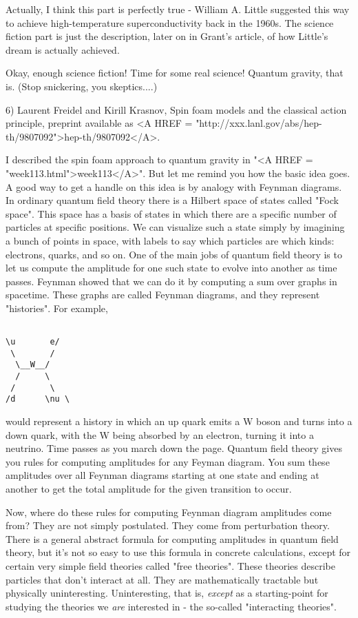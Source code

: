 Actually, I think this part is perfectly true - William A. Little
suggested this way to achieve high-temperature superconductivity back in
the 1960s.  The science fiction part is just the description, later on
in Grant's article, of how Little's dream is actually achieved.

Okay, enough science fiction!  Time for some real science!  Quantum
gravity, that is.  (Stop snickering, you skeptics....)

6) Laurent Freidel and Kirill Krasnov, Spin foam models and the 
classical action principle, preprint available as <A HREF = "http://xxx.lanl.gov/abs/hep-th/9807092">hep-th/9807092</A>.

I described the spin foam approach to quantum gravity in "<A HREF = "week113.html">week113</A>".  But
let me remind you how the basic idea goes.  A good way to get a handle
on this idea is by analogy with Feynman diagrams.  In ordinary quantum
field theory there is a Hilbert space of states called "Fock space".
This space has a basis of states in which there are a specific number of
particles at specific positions.  We can visualize such a state simply
by imagining a bunch of points in space, with labels to say which
particles are which kinds: electrons, quarks, and so on.  One of the
main jobs of quantum field theory is to let us compute the amplitude for
one such state to evolve into another as time passes.  Feynman showed
that we can do it by computing a sum over graphs in spacetime.  These
graphs are called Feynman diagrams, and they represent "histories".  For example,

\begin{verbatim}

\u       e/
 \       /
  \__W__/
  /     \
 /       \
/d      \nu \
\end{verbatim}
    
would represent a history in which an up quark emits a W boson and turns
into a down quark, with the W being absorbed by an electron, turning it
into a neutrino.  Time passes as you march down the page.  Quantum field
theory gives you rules for computing amplitudes for any Feyman diagram.
You sum these amplitudes over all Feynman diagrams starting at one state
and ending at another to get the total amplitude for the given transition
to occur.

Now, where do these rules for computing Feynman diagram amplitudes
come from?  They are not simply postulated.  They come from perturbation
theory.  There is a general abstract formula for computing amplitudes in
quantum field theory, but it's not so easy to use this formula in
concrete calculations, except for certain very simple field theories
called "free theories".  These theories describe particles
that don't interact at all.  They are mathematically tractable but
physically uninteresting.  Uninteresting, that is, \emph{except} as a
starting-point for studying the theories we \emph{are} interested in -
the so-called "interacting theories".

